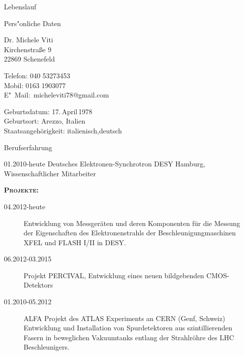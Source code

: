 \documentclass[11pt,a4paper]{scrartcl}
\begin{document}
\begin{cv}{Lebenslauf}
\begin{cvlist}{Pers"onliche Daten}
\item Dr. Michele Viti\\
Kirchenstra{\ss}e 9\\
22869 Schenefeld
\item Telefon: 040 53273453\\
Mobil: 0163 1903077\\
E"~Mail:~micheleviti78@gmail.com
\item Geburtsdatum: 17.\,April\,1978\\
Geburtsort: Arezzo, Italien\\
Staatsangeh\"origkeit: italienisch,deutsch
\end{cvlist}

\begin{cvlist}{Berufserfahrung}

\item[01.2010-heute] Deutsches Elektronen-Synchrotron DESY Hamburg,
Wissenschaftlicher Mitarbeiter

{\scshape {\bfseries Projekte:}}
\begin{description}
\item[04.2012-heute]  Entwicklung von Messger{\"a}ten und
deren Komponenten f{\"u}r die Messung der Eigenschaften des Elektronenstrahls
der Beschleunigungmaschinen XFEL und FLASH I/II in DESY.
\item[06.2012-03.2015]Projekt PERCIVAL, Entwicklung eines neuen
bildgebenden CMOS-Detektors
\item[01.2010-05.2012]ALFA Projekt des ATLAS Experiments an CERN (Genf,
Schweiz) Entwicklung und Installation von Spurdetektoren aus szintillierenden
Fasern in beweglichen Vakuumtanks entlang der Strahlr{\"o}hre des LHC
Beschleunigers.
\end{description}


\end{cvlist}
\end{cv}
\end{document}
